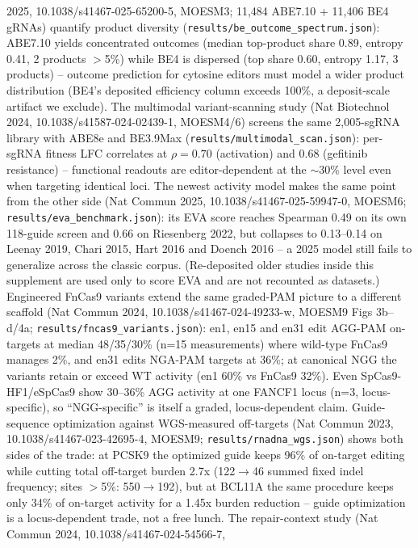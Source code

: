 \documentclass[12pt]{article}
\begin{document}
2025, 10.1038/s41467-025-65200-5, MOESM3; 11,484 ABE7.10 + 11,406 BE4
gRNAs) quantify product diversity (\texttt{results/be\_outcome\_spectrum.json}):
ABE7.10 yields concentrated outcomes (median top-product share 0.89,
entropy 0.41, 2 products $>$5\%) while BE4 is dispersed (top share 0.60,
entropy 1.17, 3 products) -- outcome prediction for cytosine editors
must model a wider product distribution (BE4's deposited efficiency
column exceeds 100\%, a deposit-scale artifact we exclude).
The multimodal variant-scanning study (Nat Biotechnol 2024,
10.1038/s41587-024-02439-1, MOESM4/6) screens the same 2,005-sgRNA
library with ABE8e and BE3.9Max
(\texttt{results/multimodal\_scan.json}): per-sgRNA fitness LFC
correlates at $\rho=0.70$ (activation) and $0.68$ (gefitinib
resistance) -- functional readouts are editor-dependent at the
$\sim$30\% level even when targeting identical loci.
The newest activity model makes the same point from the other side
(Nat Commun 2025, 10.1038/s41467-025-59947-0, MOESM6;
\texttt{results/eva\_benchmark.json}): its EVA score reaches Spearman
0.49 on its own 118-guide screen and 0.66 on Riesenberg 2022, but
collapses to 0.13--0.14 on Leenay 2019, Chari 2015, Hart 2016 and
Doench 2016 -- a 2025 model still fails to generalize across the
classic corpus. (Re-deposited older studies inside this supplement are
used only to score EVA and are not recounted as datasets.)
Engineered FnCas9 variants extend the same graded-PAM picture to a
different scaffold (Nat Commun 2024, 10.1038/s41467-024-49233-w,
MOESM9 Figs 3b--d/4a; \texttt{results/fncas9\_variants.json}): en1,
en15 and en31 edit AGG-PAM on-targets at median 48/35/30\% (n=15
measurements) where wild-type FnCas9 manages 2\%, and en31 edits
NGA-PAM targets at 36\%; at canonical NGG the variants retain or exceed
WT activity (en1 60\% vs FnCas9 32\%). Even SpCas9-HF1/eSpCas9 show
30--36\% AGG activity at one FANCF1 locus (n=3, locus-specific), so
``NGG-specific'' is itself a graded, locus-dependent claim.
Guide-sequence optimization against WGS-measured off-targets (Nat
Commun 2023, 10.1038/s41467-023-42695-4, MOESM9;
\texttt{results/rnadna\_wgs.json}) shows both sides of the trade: at
PCSK9 the optimized guide keeps 96\% of on-target editing while cutting
total off-target burden 2.7x (122$\to$46 summed fixed indel frequency;
sites $>$5\%: 550$\to$192), but at BCL11A the same procedure keeps only
34\% of on-target activity for a 1.45x burden reduction -- guide
optimization is a locus-dependent trade, not a free lunch.
The repair-context study (Nat Commun 2024, 10.1038/s41467-024-54566-7,
\end{document}
